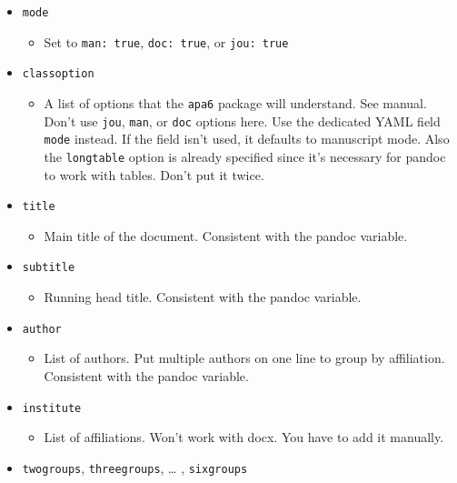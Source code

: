 \documentclass[doc,longtable]{apa6}
\let\tightlist\relax %
\begin{document}
\begin{itemize}
\tightlist
\item
  \texttt{mode}

  \begin{itemize}
  \tightlist
  \item
    Set to \texttt{man:\ true}, \texttt{doc:\ true}, or \texttt{jou:\ true}
  \end{itemize}
\item
  \texttt{classoption}

  \begin{itemize}
  \tightlist
  \item
    A list of options that the \texttt{apa6} package will understand. See manual. Don't use \texttt{jou}, \texttt{man}, or \texttt{doc} options here. Use the dedicated YAML field \texttt{mode} instead. If the field isn't used, it defaults to manuscript mode. Also the \texttt{longtable} option is already specified since it's necessary for pandoc to work with tables. Don't put it twice.
  \end{itemize}
\item
  \texttt{title}

  \begin{itemize}
  \tightlist
  \item
    Main title of the document. Consistent with the pandoc variable.
  \end{itemize}
\item
  \texttt{subtitle}

  \begin{itemize}
  \tightlist
  \item
    Running head title. Consistent with the pandoc variable.
  \end{itemize}
\item
  \texttt{author}

  \begin{itemize}
  \tightlist
  \item
    List of authors. Put multiple authors on one line to group by affiliation. Consistent with the pandoc variable.
  \end{itemize}
\item
  \texttt{institute}

  \begin{itemize}
  \tightlist
  \item
    List of affiliations. Won't work with docx. You have to add it manually.
  \end{itemize}
\item
  \texttt{twogroups}, \texttt{threegroups}, \ldots{} , \texttt{sixgroups}


\end{itemize}
\end{document}
